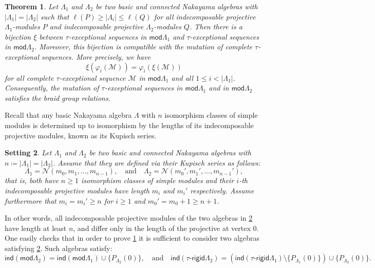 \documentclass[11pt]{amsart}
\newcommand{\ind}{\mathsf{ind}}
\newcommand{\taur}{\tau\text{-}\mathsf{rigid}}
\newcommand{\mods}{\mathsf{mod}}
\newtheorem{theorem}{Theorem}[section]
\newtheorem{setting}[theorem]{Setting}
\theoremstyle{definition}
\begin{document}
\begin{theorem}\label{thm:longerlengths}
    Let $\Lambda_1$ and $\Lambda_2$ be two basic and connected Nakayama algebras with $|\Lambda_1|=|\Lambda_2|$ such that $\ell(P) \geq |\Lambda_i| \leq \ell(Q)$ for all indecomposable projective $\Lambda_1$-modules $P$ and indecomposable projective $\Lambda_2$-modules $Q$. Then there is a bijection $\xi$ between $\tau$-exceptional sequences in $\mods \Lambda_1$ and $\tau$-exceptional sequences in $\mods \Lambda_2$. Moreover, this bijection is compatible with the mutation of complete $\tau$-exceptional sequences. More precisely, we have
    \[ \xi(\varphi_i(\mathcal{M})) = \varphi_i(\xi(\mathcal{M}))\]
    for all complete $\tau$-exceptional sequence $\mathcal{M}$ in $\mods \Lambda_1$ and all $1 \leq i < |\Lambda_1|$. Consequently, the mutation of $\tau$-exceptional sequences in $\mods \Lambda_1$ and in $\mods \Lambda_2$ satisfies the braid group relations.
\end{theorem}

Recall that any basic Nakayama algebra $\Lambda$ with $n$ isomorphism classes of simple modules is determined up to isomorphism by the lengths of its indecomposable projective modules, known as its Kupisch series. 

\begin{setting}\label{set:sec5}
    Let $\Lambda_1$ and $\Lambda_2$ be two basic and connected Nakayama algebras with $n \coloneqq |\Lambda_1|=|\Lambda_2|$. Assume that they are defined via their Kupisch series as follows: 
    \[ \Lambda_1 = \mathcal{N}(m_0, m_1, \dots, m_{n-1}), \quad \text{and} \quad \Lambda_2 = \mathcal{N}(m_0', m_1', \dots, m_{n-1}'), \]
    that is, both have $n \geq 1$ isomorphism classes of simple modules and their $i$-th indecomposable projective modules have length $m_i$ and $m_i'$ respectively. Assume furthermore that $m_i = m_i' \geq n$ for $i \geq 1$ and $m_0' = m_0+1 \geq n+1$. 
\end{setting}

In other words, all indecomposable projective modules of the two algebras in \cref{set:sec5} have length at least $n$, and differ only in the length of the projective at vertex 0. One easily checks that in order to prove \cref{thm:longerlengths} it is sufficient to consider two algebras satisfying \cref{set:sec5}. Such algebras satisfy:
\[ \ind(\mods \Lambda_2) = \ind(\mods \Lambda_1) \cup \{ P_{\Lambda_2}(0)\}, \quad\text{and} \quad \ind (\taur \Lambda_2) = (\ind (\taur \Lambda_1) \setminus \{ P_{\Lambda_1}(0)\}) \cup \{ P_{\Lambda_2}(0)\}. \]
\end{document}
